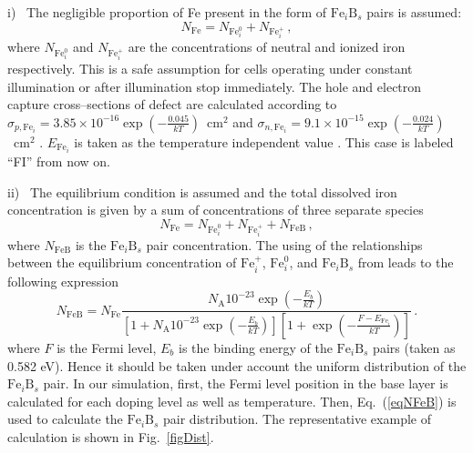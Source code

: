 \documentclass [sort&compress] {elsarticle}
\begin{document}
\noindent
i)~
The negligible proportion of Fe present in the form of $\mathrm{Fe}_i\mathrm{B}_s$ pairs is assumed:
\begin{equation}
\label{eqN1}
    N_{\mathrm{Fe}}=N_{\mathrm{Fe}_i^0}+N_{\mathrm{Fe}_i^+} \,,
\end{equation}
where
$N_{\mathrm{Fe}_i^0}$ and $N_{\mathrm{Fe}_i^+}$ are the concentrations of  neutral and ionized iron respectively.
This is a safe assumption for cells operating under constant illumination or after illumination stop immediately.
The hole and electron capture cross--sections of defect are calculated according to
$\sigma_{p,\mathrm{Fe}_i}=3.85\times10^{-16}\exp(-\frac{0.045}{kT})$~cm$^2$ and
$\sigma_{n,\mathrm{Fe}_i}=9.1\times10^{-15}\exp(-\frac{0.024}{kT})$~cm$^2$ \cite{Istratov1999,Rein2,MurphyJAP2011}.
$E_{\mathrm{Fe}_i}$ is taken as the temperature independent value \cite{Kohno}.
This case is labeled ``FI'' from now on.

\noindent
ii)~
The equilibrium condition is assumed and the total dissolved iron concentration is given by a sum of concentrations of three separate species
\begin{equation}
\label{eqN2}
    N_{\mathrm{Fe}}=N_{\mathrm{Fe}_i^0}+N_{\mathrm{Fe}_i^+}+N_{\mathrm{FeB}} \,,
\end{equation}
where
$N_\mathrm{FeB}$ is the $\mathrm{Fe}_i\mathrm{B}_s$ pair concentration.
The using of the relationships between the equilibrium concentration of $\mathrm{Fe}_i^+$, $\mathrm{Fe}_i^0$, and  $\mathrm{Fe}_i\mathrm{B}_s$ from \cite{MurphyJAP2011,FeB:kinetic}
leads to the following expression
\begin{equation}
\label{eqNFeB}
    N_{\mathrm{FeB}}=N_{\mathrm{Fe}}\frac{N_\mathrm{A}10^{-23}\exp\left(-\frac{E_b}{kT}\right)}
     {\left[1+N_\mathrm{A}10^{-23}\exp\left(-\frac{E_b}{kT}\right)\right]\left[1+\exp\left(-\frac{F-E_{\mathrm{Fe}_i}}{kT}\right)\right]}\,.
\end{equation}
where
$F$ is the Fermi level,
$E_b$ is the binding energy of the $\mathrm{Fe}_i\mathrm{B}_s$ pairs (taken as 0.582 eV).
Hence it should be taken under account the uniform distribution of the $\mathrm{Fe}_i\mathrm{B}_s$ pair.
In our simulation, first, the Fermi level position in the base layer is calculated for each doping level as well as temperature.
Then, Eq.~(\ref{eqNFeB}) is used to calculate the $\mathrm{Fe}_i\mathrm{B}_s$ pair distribution.
The representative example of calculation is shown in Fig.~\ref{figDist}.
\end{document}
